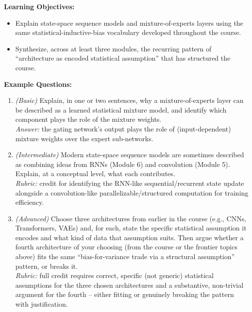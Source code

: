 \documentclass[11pt]{article}
\begin{document}
\textbf{Learning Objectives:}
\begin{itemize}
  \item Explain state-space sequence models and mixture-of-experts layers using the same statistical-inductive-bias vocabulary developed throughout the course.
  \item Synthesize, across at least three modules, the recurring pattern of ``architecture as encoded statistical assumption'' that has structured the course.
\end{itemize}

\textbf{Example Questions:}
\begin{enumerate}
  \item \textit{(Basic)} Explain, in one or two sentences, why a mixture-of-experts layer can be described as a learned statistical mixture model, and identify which component plays the role of the mixture weights. \\
  \textit{Answer:} the gating network's output plays the role of (input-dependent) mixture weights over the expert sub-networks.
  \item \textit{(Intermediate)} Modern state-space sequence models are sometimes described as combining ideas from RNNs (Module 6) and convolution (Module 5). Explain, at a conceptual level, what each contributes. \\
  \textit{Rubric:} credit for identifying the RNN-like sequential/recurrent state update alongside a convolution-like parallelizable/structured computation for training efficiency.
  \item \textit{(Advanced)} Choose three architectures from earlier in the course (e.g., CNNs, Transformers, VAEs) and, for each, state the specific statistical assumption it encodes and what kind of data that assumption suits. Then argue whether a fourth architecture of your choosing (from the course or the frontier topics above) fits the same ``bias-for-variance trade via a structural assumption'' pattern, or breaks it. \\
  \textit{Rubric:} full credit requires correct, specific (not generic) statistical assumptions for the three chosen architectures and a substantive, non-trivial argument for the fourth -- either fitting or genuinely breaking the pattern with justification.
\end{enumerate}
\end{document}
